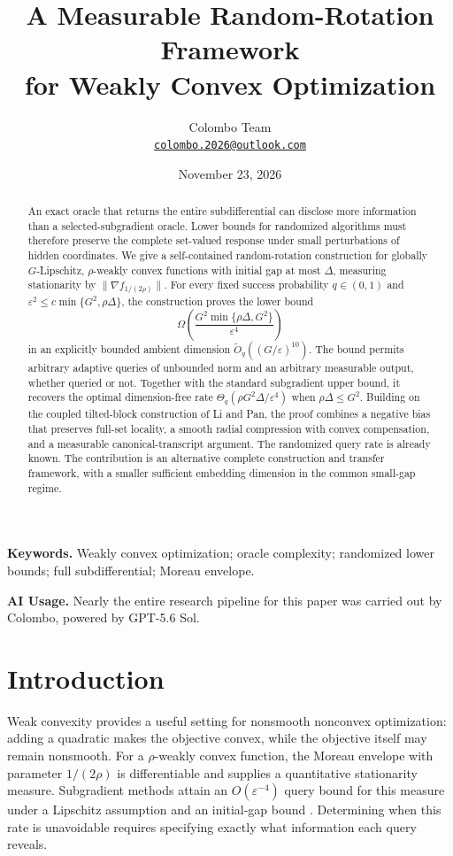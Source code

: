 \documentclass[11pt,a4paper]{article}
\title{A Measurable Random-Rotation Framework\\for Weakly Convex Optimization}
\author{Colombo Team\\[4pt]
\small\href{mailto:colombo.2026@outlook.com}{\texttt{colombo.2026@outlook.com}}}
\date{November 23, 2026}
\newcommand{\eps}{\varepsilon}
\theoremstyle{definition}
\numberwithin{equation}{section}
\begin{document}
\maketitle

\begin{abstract}
An exact oracle that returns the entire subdifferential can disclose more
information than a selected-subgradient oracle. Lower bounds for randomized
algorithms must therefore preserve the complete set-valued response under
small perturbations of hidden coordinates. We give a self-contained
random-rotation construction for globally $G$-Lipschitz, $\rho$-weakly convex
functions with initial gap at most $\Delta$, measuring stationarity by
$\|\nabla f_{1/(2\rho)}\|$. For every fixed success probability $q\in(0,1)$
and $\eps^2\le c\min\{G^2,\rho\Delta\}$, the construction proves the lower bound
\[
 \Omega\!\left(\frac{G^2\min\{\rho\Delta,G^2\}}{\eps^4}\right)
\]
in an explicitly bounded ambient dimension
$\widetilde O_q((G/\eps)^{10})$. The bound permits arbitrary adaptive queries
of unbounded norm and an arbitrary measurable output, whether queried or not.
Together with the standard subgradient upper bound, it recovers the optimal
dimension-free rate $\Theta_q(\rho G^2\Delta/\eps^4)$ when
$\rho\Delta\le G^2$. Building on the coupled tilted-block construction of
Li and Pan, the proof combines a negative bias that preserves full-set
locality, a smooth radial compression with convex compensation, and a
measurable canonical-transcript argument. The randomized query rate is
already known. The contribution is an alternative complete construction and
transfer framework, with a smaller sufficient embedding dimension in the
common small-gap regime.
\end{abstract}

\noindent\textbf{Keywords.} Weakly convex optimization; oracle complexity;
randomized lower bounds; full subdifferential; Moreau envelope.

\begin{samepage}
\noindent\textbf{AI Usage.}
Nearly the entire research pipeline for this paper was carried out by
Colombo, powered by GPT-5.6 Sol.
\par
\end{samepage}

\section{Introduction}\label{sec:introduction}

Weak convexity provides a useful setting for nonsmooth nonconvex optimization:
adding a quadratic makes the objective convex, while the objective itself may
remain nonsmooth. For a $\rho$-weakly convex function, the Moreau envelope with
parameter $1/(2\rho)$ is differentiable and supplies a quantitative stationarity
measure. Subgradient methods attain an $O(\eps^{-4})$ query bound for this
measure under a Lipschitz assumption and an initial-gap bound
\cite{DavisDrusvyatskiy2019}. Determining when this rate is unavoidable requires
specifying exactly what information each query reveals.
\end{document}
